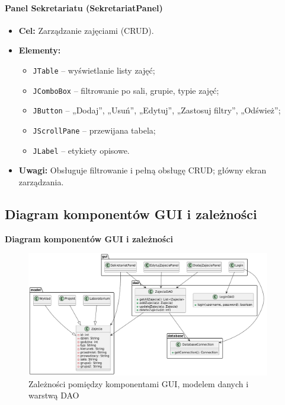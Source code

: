\paragraph{Panel Sekretariatu (SekretariatPanel)}

\begin{itemize}
    \item \textbf{Cel:} Zarządzanie zajęciami (CRUD).
    \item \textbf{Elementy:}
    \begin{itemize}
        \item \texttt{JTable} – wyświetlanie listy zajęć;
        \item \texttt{JComboBox} – filtrowanie po sali, grupie, typie zajęć;
        \item \texttt{JButton} – „Dodaj”, „Usuń”, „Edytuj”, „Zastosuj filtry”, „Odśwież”;
        \item \texttt{JScrollPane} – przewijana tabela;
        \item \texttt{JLabel} – etykiety opisowe.
    \end{itemize}
    \item \textbf{Uwagi:} Obsługuje filtrowanie i pełną obsługę CRUD; główny ekran zarządzania.
\end{itemize}

\subsection{Diagram komponentów GUI i zależności}
\vspace{1em}
\noindent\textbf{Diagram komponentów GUI i zależności}

\vspace{0.5em}
\begin{figure}[H]
    \centering
    \includegraphics[width=0.95\textwidth]{figures/diagram.png}
    \caption{Zależności pomiędzy komponentami GUI, modelem danych i warstwą DAO}
    \label{fig:diagram-gui}
\end{figure}
